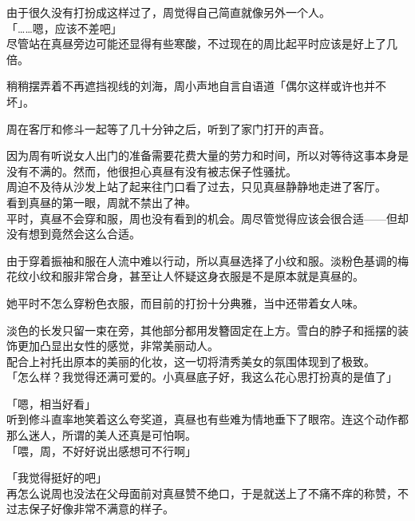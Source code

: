 由于很久没有打扮成这样过了，周觉得自己简直就像另外一个人。\\

「……嗯，应该不差吧」\\

尽管站在真昼旁边可能还显得有些寒酸，不过现在的周比起平时应该是好上了几倍。

稍稍摆弄着不再遮挡视线的刘海，周小声地自言自语道「偶尔这样或许也并不坏」。\\

\vspace{2\baselineskip}

周在客厅和修斗一起等了几十分钟之后，听到了家门打开的声音。

因为周有听说女人出门的准备需要花费大量的劳力和时间，所以对等待这事本身是没有不满的。然而，他很担心真昼有没有被志保子性骚扰。\\

周迫不及待从沙发上站了起来往门口看了过去，只见真昼静静地走进了客厅。\\

看到真昼的第一眼，周就不禁出了神。\\

平时，真昼不会穿和服，周也没有看到的机会。周尽管觉得应该会很合适——但却没有想到竟然会这么合适。

由于穿着振袖和服在人流中难以行动，所以真昼选择了小纹和服。淡粉色基调的梅花纹小纹和服非常合身，甚至让人怀疑这身衣服是不是原本就是真昼的。

她平时不怎么穿粉色衣服，而目前的打扮十分典雅，当中还带着女人味。

淡色的长发只留一束在旁，其他部分都用发簪固定在上方。雪白的脖子和摇摆的装饰更加凸显出女性的感觉，非常美丽动人。\\

配合上衬托出原本的美丽的化妆，这一切将清秀美女的氛围体现到了极致。\\

「怎么样？我觉得还满可爱的。小真昼底子好，我这么花心思打扮真的是值了」

「嗯，相当好看」\\

听到修斗直率地笑着这么夸奖道，真昼也有些难为情地垂下了眼帘。连这个动作都那么迷人，所谓的美人还真是可怕啊。\\

「喂，周，不好好说出感想可不行啊」

「我觉得挺好的吧」\\

再怎么说周也没法在父母面前对真昼赞不绝口，于是就送上了不痛不痒的称赞，不过志保子好像非常不满意的样子。\\

